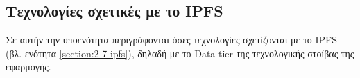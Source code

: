 \subsection{Τεχνολογίες σχετικές με το IPFS}

Σε αυτήν την υποενότητα περιγράφονται όσες τεχνολογίες σχετίζονται με το IPFS (βλ. ενότητα \ref{section:2-7-ipfs}), δηλαδή με το Data tier της τεχνολογικής στοίβας της εφαρμογής.




